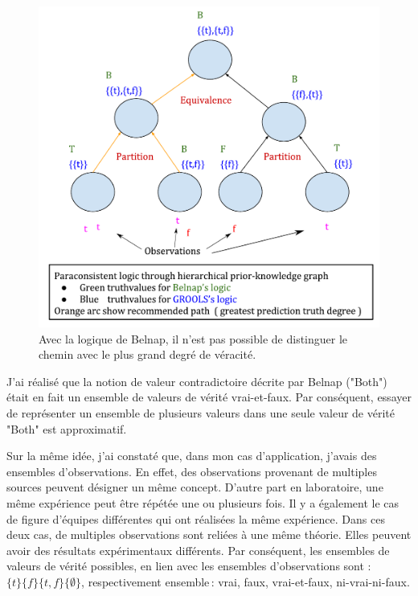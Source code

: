 \begin{refsegment}
\begin{shadedfigure}[H]
\begin{subfigure}[t]{.48\textwidth}
		\includegraphics[width=\textwidth]{img/GROOLS_vs_belnap_2.pdf}
		\caption{Avec la logique de Belnap, il n'est pas possible de distinguer le chemin avec le plus grand degré de véracité. }
		\label{fig:grools_belnap_2}
	\end{subfigure}
	\label{fig:grools_belnap}
\end{shadedfigure}

J'ai réalisé que la notion de valeur contradictoire décrite par Belnap ("Both") était en fait un ensemble de valeurs de vérité vrai-et-faux. Par conséquent, essayer de représenter un ensemble de plusieurs valeurs dans une seule valeur de vérité "Both" est approximatif.

Sur la même idée, j'ai constaté que, dans mon cas d'application, j'avais des ensembles d'observations. En effet, des observations provenant de multiples sources peuvent désigner un même concept. D'autre part en laboratoire, une même expérience peut être répétée une ou plusieurs fois. Il y a également le cas de figure d'équipes différentes qui ont réalisées la même expérience. Dans ces deux cas, de multiples observations sont reliées à une même théorie. Elles peuvent avoir des résultats expérimentaux différents. Par conséquent, les ensembles de valeurs de vérité possibles, en lien avec les ensembles d'observations sont : $\{t\} \{f\} \{t,f\} \{\emptyset\}$, respectivement ensemble : vrai, faux, vrai-et-faux, ni-vrai-ni-faux. 


\end{refsegment}
